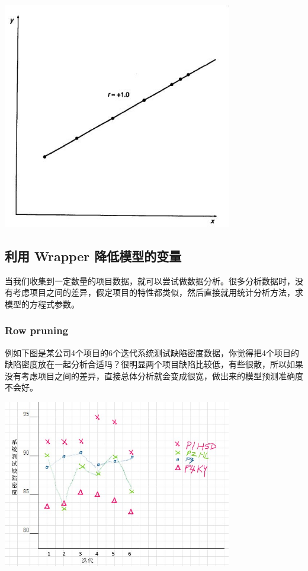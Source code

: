 
\includegraphics[width=10cm]{maxwell_f68.jpg}

\hypertarget{ux5229ux7528-wrapper-ux964dux4f4eux6a21ux578bux7684ux53d8ux91cf}{%
\subsection{利用 Wrapper
降低模型的变量}\label{ux5229ux7528-wrapper-ux964dux4f4eux6a21ux578bux7684ux53d8ux91cf}}

当我们收集到一定数量的项目数据，就可以尝试做数据分析。很多分析数据时，没有考虑项目之间的差异，假定项目的特性都类似，然后直接就用统计分析方法，求模型的方程式参数。\\

\hypertarget{row-pruning}{%
\subsubsection{Row pruning}\label{row-pruning}}

例如下图是某公司4个项目的6个迭代系统测试缺陷密度数据，你觉得把4个项目的缺陷密度放在一起分析合适吗？很明显两个项目缺陷比较低，有些很散，所以如果没有考虑项目之间的差异，直接总体分析就会变成很宽，做出来的模型预测准确度不会好。


\includegraphics[width=10cm]{M4BrowPruningGraphScreenshot_2023-01-04_203004.jpg}

